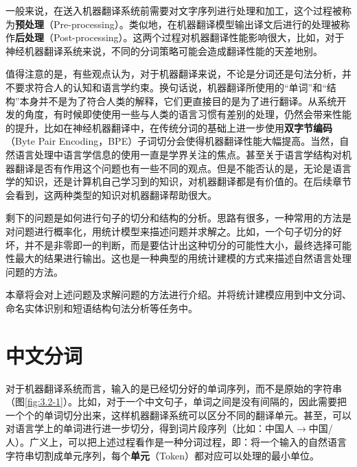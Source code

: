 \parinterval 一般来说，在送入机器翻译系统前需要对文字序列进行处理和加工，这个过程被称为{\small\sffamily\bfseries{预处理}}（Pre-processing）。类似地，在机器翻译模型输出译文后进行的处理被称作{\small\sffamily\bfseries{后处理}}（Post-processing）。这两个过程对机器翻译性能影响很大，比如，对于神经机器翻译系统来说，不同的分词策略可能会造成翻译性能的天差地别。

\parinterval 值得注意的是，有些观点认为，对于机器翻译来说，不论是分词还是句法分析，并不要求符合人的认知和语言学约束。换句话说，机器翻译所使用的“单词”和“结构”本身并不是为了符合人类的解释，它们更直接目的是为了进行翻译。从系统开发的角度，有时候即使使用一些与人类的语言习惯有差别的处理，仍然会带来性能的提升，比如在神经机器翻译中，在传统分词的基础上进一步使用{\small\sffamily\bfseries{双字节编码}}（Byte Pair Encoding，BPE）子词切分会使得机器翻译性能大幅提高。当然，自然语言处理中语言学信息的使用一直是学界关注的焦点。甚至关于语言学结构对机器翻译是否有作用这个问题也有一些不同的观点。但是不能否认的是，无论是语言学的知识，还是计算机自己学习到的知识，对机器翻译都是有价值的。在后续章节会看到，这两种类型的知识对机器翻译帮助很大。

\parinterval 剩下的问题是如何进行句子的切分和结构的分析。思路有很多，一种常用的方法是对问题进行概率化，用统计模型来描述问题并求解之。比如，一个句子切分的好坏，并不是非零即一的判断，而是要估计出这种切分的可能性大小，最终选择可能性最大的结果进行输出。这也是一种典型的用统计建模的方式来描述自然语言处理问题的方法。

\parinterval 本章将会对上述问题及求解问题的方法进行介绍。并将统计建模应用到中文分词、命名实体识别和短语结构句法分析等任务中。


\section{中文分词}

\parinterval 对于机器翻译系统而言，输入的是已经切分好的单词序列，而不是原始的字符串（图\ref{fig:3.2-1}）。比如，对于一个中文句子，单词之间是没有间隔的，因此需要把一个个的单词切分出来，这样机器翻译系统可以区分不同的翻译单元。甚至，可以对语言学上的单词进行进一步切分，得到词片段序列（比如：中国人$\to$中国/人）。广义上，可以把上述过程看作是一种分词过程，即：将一个输入的自然语言字符串切割成单元序列，每个{\small\sffamily\bfseries{单元}}（Token）都对应可以处理的最小单位。

